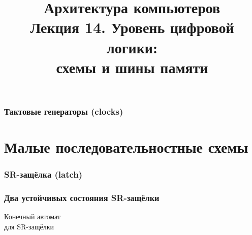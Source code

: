 \newcommand{\h}{%
handout,%
}



\usepackage{tikz}
\usetikzlibrary{arrows,automata}

\usepackage{framed}
\usepackage{tabu}

\newcommand{\p}{\textbf{\textcolor{green}{+}}}
\newcommand{\myminus}{\textbf{\textcolor{red}{–}}}

\title[Цифровая логика: схемы памяти]{Архитектура компьютеров\texorpdfstring{\\}{ }
Лекция 14. Уровень цифровой логики:\texorpdfstring{\\}{ }схемы и шины памяти}



\begin{frame}
\titlepage
\end{frame}

\begin{frame}
\frametitle{Тактовые генераторы (clocks)}
\end{frame}

\section{Малые последовательностные схемы}

\begin{frame}
\frametitle{SR-защёлка (latch)}
\end{frame}

\begin{frame}
\frametitle{Два устойчивых состояния SR-защёлки}

\vspace{-.2cm}

\pause
\centering
\vspace{-.1cm}
\begin{minipage}{8cm}
\begin{framed}
\vspace{-.2cm}
        \parbox{4cm}{Конечный автомат\\
            для SR-защёлки}
        \parbox{3cm}{}
\vspace{-.2cm}
\end{framed}
\end{minipage}
\end{frame}


